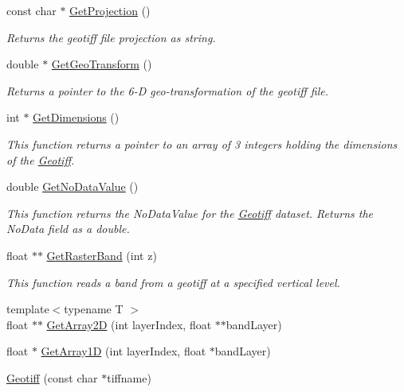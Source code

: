 \begin{DoxyCompactItemize}
const char $\ast$ \hyperlink{class_geotiff_aa5dd4888f23c1957f835264c29b7556a}{Get\+Projection} ()
\begin{DoxyCompactList}\small\item\em Returns the geotiff file projection as string. \end{DoxyCompactList}\item 
double $\ast$ \hyperlink{class_geotiff_a7dee40d63ee0669f7277407409036399}{Get\+Geo\+Transform} ()
\begin{DoxyCompactList}\small\item\em Returns a pointer to the 6-\/D geo-\/transformation of the geotiff file. \end{DoxyCompactList}\item 
int $\ast$ \hyperlink{class_geotiff_af192cd1890942ff57d072d4730210523}{Get\+Dimensions} ()
\begin{DoxyCompactList}\small\item\em This function returns a pointer to an array of 3 integers holding the dimensions of the \hyperlink{class_geotiff}{Geotiff}. \end{DoxyCompactList}\item 
double \hyperlink{class_geotiff_ac07c56345e9faa2bd95d542ef14dfcb1}{Get\+No\+Data\+Value} ()
\begin{DoxyCompactList}\small\item\em This function returns the No\+Data\+Value for the \hyperlink{class_geotiff}{Geotiff} dataset. Returns the No\+Data field as a double. \end{DoxyCompactList}\item 
float $\ast$$\ast$ \hyperlink{class_geotiff_a07feabdc5c551695fb5aa7387727f8de}{Get\+Raster\+Band} (int z)
\begin{DoxyCompactList}\small\item\em This function reads a band from a geotiff at a specified vertical level. \end{DoxyCompactList}\item 
{\footnotesize template$<$typename T $>$ }\\float $\ast$$\ast$ \hyperlink{class_geotiff_a922f027c08e3748239031119fb103543}{Get\+Array2D} (int layer\+Index, float $\ast$$\ast$band\+Layer)
\item 
float $\ast$ \hyperlink{class_geotiff_af78d2f0527b69a9706e7e55ad48f831c}{Get\+Array1D} (int layer\+Index, float $\ast$band\+Layer)
\item 
\hyperlink{class_geotiff_a6afb0b8b363cd25ba034abdeffe349b0}{Geotiff} (const char $\ast$tiffname)
$$
\end{DoxyCompactItemize}
